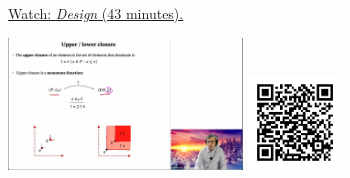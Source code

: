 
\begin{minipage}{10cm}
    \href{https://act4e-spring21.netlify.app/videos/spring2021-design:design.html}{Watch: \emph{Design} (43 minutes).}
        
    \href{https://act4e-spring21.netlify.app/videos/spring2021-design:design.html}{\includegraphics[height=3.5cm]{spring2021-design:design/thumbnails.jpg}}
    \href{https://act4e-spring21.netlify.app/videos/spring2021-design:design.html}{\includegraphics[height=2.5cm]{spring2021-design:design/qrcode.png}}
\end{minipage}

